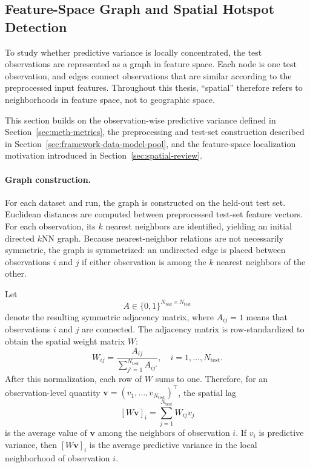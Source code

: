 \subsection{Feature-Space Graph and Spatial Hotspot Detection}
\label{sec:meth-graph}

To study whether predictive variance is locally concentrated, the test observations are
represented as a graph in feature space. Each node is one test observation, and edges
connect observations that are similar according to the preprocessed input features.
Throughout this thesis, ``spatial'' therefore refers to neighborhoods in feature space, not
to geographic space.

This section builds on the observation-wise predictive variance defined in
Section~\ref{sec:meth-metrics}, the preprocessing and test-set construction described
in Section~\ref{sec:framework-data-model-pool}, and the feature-space localization motivation introduced
in Section~\ref{sec:spatial-review}.

\paragraph{Graph construction.}
\label{sec:method-spatial}
For each dataset and run, the graph is constructed on the held-out test set. Euclidean
distances are computed between preprocessed test-set feature vectors. For each
observation, its $k$ nearest neighbors are identified, yielding an initial directed $k$NN
graph. Because nearest-neighbor relations are not necessarily symmetric, the graph is
symmetrized: an undirected edge is placed between observations $i$ and $j$ if either
observation is among the $k$ nearest neighbors of the other.

Let
\[
A \in \{0, 1\}^{N_{\mathrm{test}}\times N_{\mathrm{test}}}
\]
denote the resulting symmetric adjacency matrix, where $A_{ij}=1$ means that
observations $i$ and $j$ are connected. The adjacency matrix is row-standardized to obtain
the spatial weight matrix $W$:
\[
W_{ij} = \frac{A_{ij}}{\sum_{j'=1}^{N_{\mathrm{test}}} A_{ij'}},
\quad i=1,\dots,N_{\mathrm{test}}.
\]
After this normalization, each row of $W$ sums to one. Therefore, for an
observation-level quantity $\mathbf{v}=(v_1,\dots,v_{N_{\mathrm{test}}})^\top$, the spatial lag
\[
[W\mathbf{v}]_i = \sum_{j=1}^{N_{\mathrm{test}}} W_{ij}v_j
\]
is the average value of $\mathbf{v}$ among the neighbors of observation $i$. If $v_i$ is
predictive variance, then $[W\mathbf{v}]_i$ is the average predictive variance in the local
neighborhood of observation $i$.

